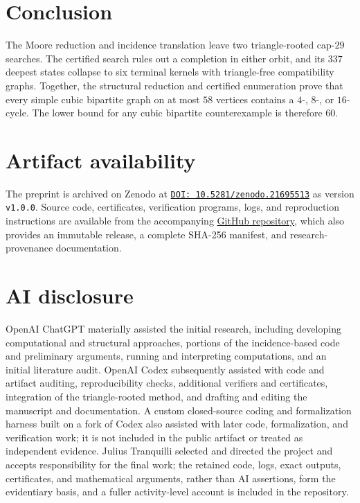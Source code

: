\documentclass[11pt]{article}
\theoremstyle{definition}
\newcommand{\code}[1]{\texttt{#1}}
\begin{document}
\section{Conclusion}

The Moore reduction and incidence translation leave two triangle-rooted
cap-\(29\) searches. The certified search rules out a completion in either
orbit, and its \(337\) deepest states collapse to six terminal kernels with
triangle-free compatibility graphs. Together, the structural reduction and
certified enumeration prove that every simple cubic bipartite graph on at most
\(58\) vertices contains a \(4\)-, \(8\)-, or \(16\)-cycle. The lower bound
for any cubic bipartite counterexample is therefore \(60\).

\section*{Artifact availability}

The preprint is archived on Zenodo at
\href{https://doi.org/10.5281/zenodo.21695513}
{\code{DOI: 10.5281/zenodo.21695513}} as version \code{v1.0.0}. Source code,
certificates, verification programs, logs, and reproduction instructions are
available from the accompanying
\href{https://github.com/floor-licker/erdos-gyarfas-cubic-bipartite}
{GitHub repository}, which also provides an immutable release, a complete
SHA-256 manifest, and research-provenance documentation.

\section*{AI disclosure}

OpenAI ChatGPT materially assisted the initial research, including developing
computational and structural approaches, portions of the incidence-based code
and preliminary arguments, running and interpreting computations, and an
initial literature audit. OpenAI Codex subsequently assisted with code and
artifact auditing, reproducibility checks, additional verifiers and
certificates, integration of the triangle-rooted method, and drafting and
editing the manuscript and documentation. A custom closed-source coding and
formalization harness built on a fork of Codex also assisted with later code,
formalization, and verification work; it is not included in the public
artifact or treated as independent evidence. Julius Tranquilli selected and
directed the project and accepts responsibility for the final work; the
retained code, logs, exact outputs, certificates, and mathematical arguments,
rather than AI assertions, form the evidentiary basis, and a fuller
activity-level account is included in the repository.
\end{document}
